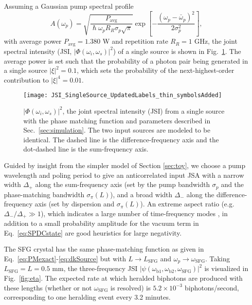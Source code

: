 \documentclass[twocolumn,amssymb, nobibnotes, showpacs, aps, pra,10pt]{revtex4-1}
\newcommand*{\wi}{\omega_{i}}
\newcommand*{\ws}{\omega_{s}}
\newcommand*{\wbone}{\omega_{\textrm{b}1}}
\newcommand*{\wbtwo}{\omega_{\textrm{b}2}}
\newcommand*{\wsfg}{\omega_\textrm{SFG}}
\begin{document}
Assuming a Gaussian pump spectral profile
\begin{equation} \label{eq:PMbandwidth}
A(\omega_p) = \sqrt{\frac{P_{\text{avg}}}{\hslash \omega_p R_R \sigma_p \sqrt{\pi}}} \exp \left[ -\frac{(\omega_p - \bar{\omega}_p)^2}{2 \sigma_p^2} \right],
\end{equation}
with average power $P_{\text{avg}} = 1.380$ W and repetition rate $R_R = 1$ GHz, the joint spectral intensity (JSI, $|\Phi(\wi,\ws)|^2$) of a single source is shown in Fig.\ \ref{fig:sourceJSI}. The average power is set such that the probability of a photon pair being generated in a single source $|\xi|^2=0.1$, which sets the probability of the next-highest-order contribution to $|\xi|^4=0.01$.

\begin{figure}[htb]
\begin{center}
\texttt{[image: JSI\_SingleSource\_UpdatedLabels\_thin\_symbolsAdded]}
\caption{$|\Phi(\wi,\ws)|^2$, the joint spectral intensity (JSI) from a single source with the phase matching function and parameters described in Sec.\ \ref{sec:simulation}. The two input sources are modeled to be identical. The dashed line is the difference-frequency axis and the dot-dashed line is the sum-frequency axis.}
\label{fig:sourceJSI}
\end{center}
\end{figure}
Guided by insight from the simpler model of Section \ref{sec:toy}, we choose a pump wavelength and poling period to give an anticorrelated input JSA with a narrow width $\Delta_+$ along the sum-frequency axis (set by the pump bandwidth $\sigma_p$ and the phase-matching bandwidth $\sigma_\pi(L)$), and a broad width $\Delta_-$ along the difference-frequency axis (set by dispersion and  $\sigma_\pi(L)$). An extreme aspect ratio (e.g.\ $\Delta_-/\Delta_+ \gg 1$), which indicates a large number of time-frequency modes \cite{Nunn2013}, in addition to a small probability amplitude for the vacuum term in Eq.\ \eqref{eq:SPDCstate} are good heuristics for large negativity.

The SFG crystal has the same phase-matching function as given in Eq.\ \eqref{eq:PMexact}-\eqref{eq:dkSource} but with $L \to L_{\text{SFG}}$ and $\omega_p \to \wsfg$. Taking $L_{\text{SFG}} = L= 0.5$ mm, the three-frequency JSI $|\psi(\wbone,\wbtwo,\wsfg)|^2$ is visualized in Fig.\ \ref{fig:eta}. The expected rate at which heralded biphotons are produced with these lengths (whether or not $\wsfg$ is resolved) is $5.2\times10^{-3}$ biphotons/second, corresponding to one heralding event every 3.2 minutes.
\end{document}
